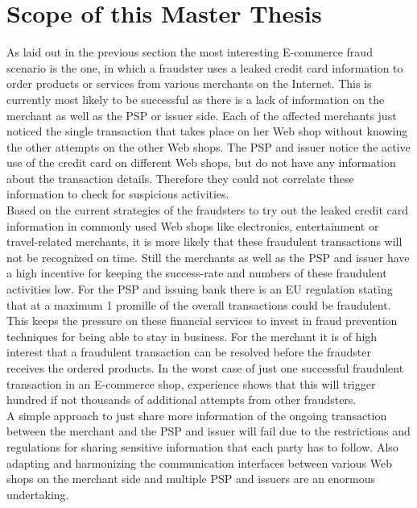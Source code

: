 
\section{Scope of this Master Thesis}
\label{sec:scope_thesis}

As laid out in the previous section the most interesting E-commerce fraud scenario is the one, in which a fraudster uses a leaked credit card information to order products or services from various merchants on the Internet. This is currently most likely to be successful as there is a lack of information on the merchant as well as the \gls{PSP} or issuer side. Each of the affected merchants just noticed the single transaction that takes place on her Web shop without knowing the other attempts on the other Web shops. The \gls{PSP} and issuer notice the active use of the credit card on different Web shops, but do not have any information about the transaction details. Therefore they could not correlate these information to check for suspicious activities. \\

Based on the current strategies of the fraudsters to try out the leaked credit card information in commonly used Web shops like electronics, entertainment or travel-related merchants, it is more likely that these fraudulent transactions will not be recognized on time. Still the merchants as well as the \gls{PSP} and issuer have a high incentive for keeping the success-rate and numbers of these fraudulent activities low. For the \gls{PSP} and issuing bank there is an EU regulation stating that at a maximum 1 promille of the overall transactions could be fraudulent. This keeps the pressure on these financial services to invest in fraud prevention techniques for being able to stay in business. For the merchant it is of high interest that a fraudulent transaction can be resolved before the fraudster receives the ordered products. In the worst case of just one successful fraudulent transaction in an E-commerce shop, experience shows that this will trigger hundred if not thousands of additional attempts from other fraudsters. \\

A simple approach to just share more information of the ongoing transaction between the merchant and the \gls{PSP} and issuer will fail due to the restrictions and regulations for sharing sensitive information that each party has to follow. Also adapting and harmonizing the communication interfaces between various Web shops on the merchant side and multiple \gls{PSP} and issuers are an enormous undertaking. \\

